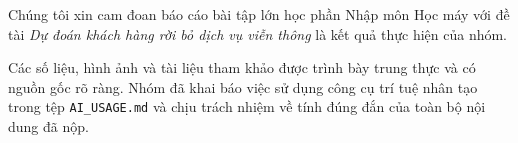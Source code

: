 
Chúng tôi xin cam đoan báo cáo bài tập lớn học phần Nhập môn Học máy với đề tài
\emph{Dự đoán khách hàng rời bỏ dịch vụ viễn thông} là kết quả thực hiện của nhóm.

Các số liệu, hình ảnh và tài liệu tham khảo được trình bày trung thực và có nguồn gốc rõ ràng.
Nhóm đã khai báo việc sử dụng công cụ trí tuệ nhân tạo trong tệp \texttt{AI\_USAGE.md} và chịu trách nhiệm về
tính đúng đắn của toàn bộ nội dung đã nộp.
